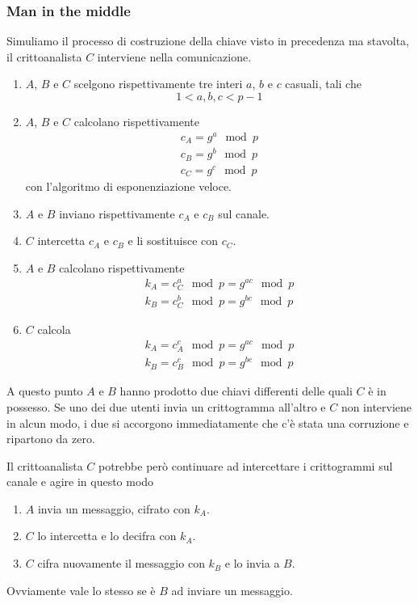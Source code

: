 \subsubsection{Man in the middle}
Simuliamo il processo di costruzione della chiave visto in precedenza ma stavolta, il crittoanalista $C$ interviene
nella comunicazione.
\begin{enumerate}
	\item $A$, $B$ e $C$ scelgono rispettivamente tre interi $a$, $b$ e $c$ casuali, tali che
	      \[ 1 < a, b, c < p-1 \]
	\item $A$, $B$ e $C$ calcolano rispettivamente
	      \begin{gather*}
		      c_A = g^a \mod{p} \\
		      c_B = g^b \mod{p} \\
		      c_C = g^c \mod{p}
	      \end{gather*}
	      con l'algoritmo di esponenziazione veloce.
	\item $A$ e $B$ inviano rispettivamente $c_A$ e $c_B$ sul canale.
	\item $C$ intercetta $c_A$ e $c_B$ e li sostituisce con $c_C$.
	\item $A$ e $B$ calcolano rispettivamente
	      \begin{gather*}
		      k_A = c_C^a \mod{p} = g^{ac} \mod{p} \\
		      k_B = c_C^b \mod{p} = g^{bc} \mod{p}
	      \end{gather*}
	\item $C$ calcola
	      \begin{gather*}
		      k_A = c_A^c \mod{p} = g^{ac} \mod{p} \\
		      k_B = c_B^c \mod{p} = g^{bc} \mod{p}
	      \end{gather*}
\end{enumerate}
A questo punto $A$ e $B$ hanno prodotto due chiavi differenti delle quali $C$ \`e in possesso. Se uno dei due utenti
invia un crittogramma all'altro e $C$ non interviene in alcun modo, i due si accorgono immediatamente che c'\`e
stata una corruzione e ripartono da zero.

Il crittoanalista $C$ potrebbe per\`o continuare ad intercettare i crittogrammi sul canale e agire in questo modo
\begin{enumerate}
	\item $A$ invia un messaggio, cifrato con $k_A$.
	\item $C$ lo intercetta e lo decifra con $k_A$.
	\item $C$ cifra nuovamente il messaggio con $k_B$ e lo invia a $B$.
\end{enumerate}
Ovviamente vale lo stesso se \`e $B$ ad inviare un messaggio.

